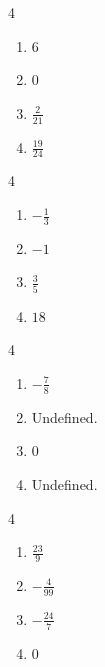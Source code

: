 \documentclass{ximera}
\begin{document}
	\author{Stitz-Zeager}


\begin{multicols}{4}
\begin{enumerate}

\item $6$
\item $0$
\item  $\frac{2}{21}$
\item  $\frac{19}{24}$

\setcounter{HW}{\value{enumi}}
\end{enumerate}
\end{multicols}

\begin{multicols}{4}
\begin{enumerate}
\setcounter{enumi}{\value{HW}}

\item  $-\frac{1}{3}$
\item  $-1$
\item  $\frac{3}{5}$
\item  $18$

\setcounter{HW}{\value{enumi}}
\end{enumerate}
\end{multicols}

\begin{multicols}{4}
\begin{enumerate}
\setcounter{enumi}{\value{HW}}

\item  $-\frac{7}{8}$
\item  Undefined.
\item  $0$
\item  Undefined.

\setcounter{HW}{\value{enumi}}
\end{enumerate}
\end{multicols}



\begin{multicols}{4}
\begin{enumerate}
\setcounter{enumi}{\value{HW}}

\item  $\frac{23}{9}$
\item  $-\frac{4}{99}$
\item  $-\frac{24}{7}$
\item  $0$

\setcounter{HW}{\value{enumi}}
\end{enumerate}
\end{multicols}
\end{document}
